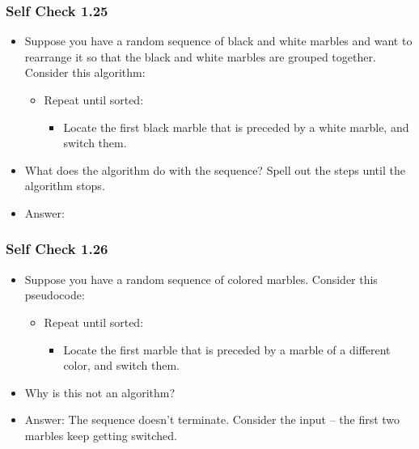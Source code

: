 \documentclass{beamer}
\begin{document}
\begin{frame}[t,fragile] \frametitle{Self Check 1.25} %
    \begin{itemize}
        \item Suppose you have a random sequence of black and white marbles and want to rearrange it so that the black and white marbles are grouped together. Consider this algorithm:
        \begin{itemize}
            \item Repeat until sorted:
            \begin{itemize}
                \item Locate the first black marble that is preceded by a white marble, and switch them.
            \end{itemize}
        \end{itemize}
        \item What does the algorithm do with the sequence? Spell out the steps until the algorithm stops.
        \item Answer:
    \end{itemize}
\end{frame}

\begin{frame}[t,fragile] \frametitle{Self Check 1.26} %
    \begin{itemize}
        \item Suppose you have a random sequence of colored marbles. Consider this pseudocode:
        \begin{itemize}
            \item Repeat until sorted:
            \begin{itemize}
                \item Locate the first marble that is preceded by a marble of a different color, and switch them.
            \end{itemize}
        \end{itemize}
        \item Why is this not an algorithm?
        \item Answer: The sequence doesn't terminate. Consider the input -- the first two marbles keep getting switched.
    \end{itemize}
\end{frame}

\end{document}
